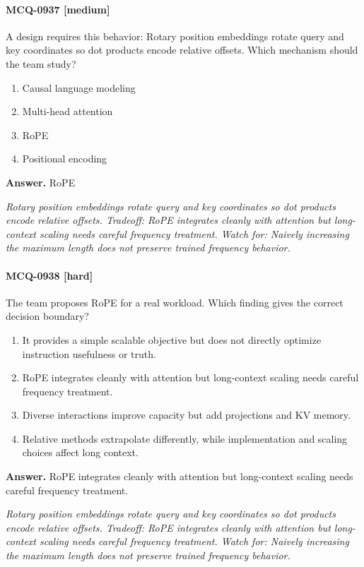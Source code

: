 \paragraph{MCQ-0937 [medium]} A design requires this behavior: Rotary position embeddings rotate query and key coordinates so dot products encode relative offsets. Which mechanism should the team study?
\begin{enumerate}[label=\Alph*.]
\item Causal language modeling
\item Multi-head attention
\item RoPE
\item Positional encoding
\end{enumerate}
\noindent\textbf{Answer.} RoPE
\par\textit{Rotary position embeddings rotate query and key coordinates so dot products encode relative offsets. Tradeoff: RoPE integrates cleanly with attention but long-context scaling needs careful frequency treatment. Watch for: Naively increasing the maximum length does not preserve trained frequency behavior.}
\paragraph{MCQ-0938 [hard]} The team proposes RoPE for a real workload. Which finding gives the correct decision boundary?
\begin{enumerate}[label=\Alph*.]
\item It provides a simple scalable objective but does not directly optimize instruction usefulness or truth.
\item RoPE integrates cleanly with attention but long-context scaling needs careful frequency treatment.
\item Diverse interactions improve capacity but add projections and KV memory.
\item Relative methods extrapolate differently, while implementation and scaling choices affect long context.
\end{enumerate}
\noindent\textbf{Answer.} RoPE integrates cleanly with attention but long-context scaling needs careful frequency treatment.
\par\textit{Rotary position embeddings rotate query and key coordinates so dot products encode relative offsets. Tradeoff: RoPE integrates cleanly with attention but long-context scaling needs careful frequency treatment. Watch for: Naively increasing the maximum length does not preserve trained frequency behavior.}
